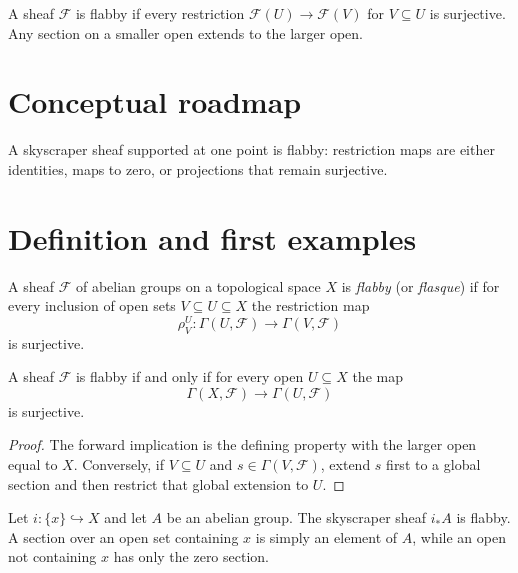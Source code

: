 \begin{example}\label{ex:vi46-expand-01}
A sheaf $\mathcal F$ is flabby if every restriction $\mathcal F(U)\to\mathcal F(V)$ for $V\subseteq U$ is surjective.  Any section on a smaller open extends to the larger open.
\end{example}
\section*{Conceptual roadmap}


\begin{example}\label{ex:vi46-expand-02}
A skyscraper sheaf supported at one point is flabby: restriction maps are either identities, maps to zero, or projections that remain surjective.
\end{example}
\section{Definition and first examples}
\begin{definition}\label{def:vi46-flabby}
A sheaf $\mathcal F$ of abelian groups on a topological space $X$ is \emph{flabby} (or \emph{flasque}) if for every inclusion of open sets $V\subseteq U\subseteq X$ the restriction map
\[
\rho^U_V:\Gamma(U,\mathcal F)\longrightarrow\Gamma(V,\mathcal F)
\]
is surjective.
\end{definition}


\begin{proposition}\label{prop:vi46-global-criterion}
A sheaf $\mathcal F$ is flabby if and only if for every open $U\subseteq X$ the map
\[
\Gamma(X,\mathcal F)\longrightarrow\Gamma(U,\mathcal F)
\]
is surjective.
\begin{proof}
The forward implication is the defining property with the larger open equal to $X$. Conversely, if $V\subseteq U$ and $s\in\Gamma(V,\mathcal F)$, extend $s$ first to a global section and then restrict that global extension to $U$.
\end{proof}
\end{proposition}


\begin{example}\label{ex:vi46-skyscraper}
Let $i:\{x\}\hookrightarrow X$ and let $A$ be an abelian group. The skyscraper sheaf $i_*A$ is flabby. A section over an open set containing $x$ is simply an element of $A$, while an open not containing $x$ has only the zero section.
\end{example}

